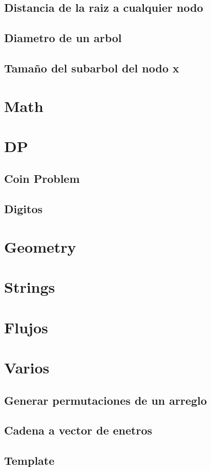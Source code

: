 	\subsection{Distancia de la raiz a cualquier nodo}
	\subsection{Diametro de un arbol}
	\subsection{Tamaño del subarbol del nodo x}


\section{Math}

\section{DP}
	\subsection{Coin Problem}
	\subsection{Digitos}

\section{Geometry}


\section{Strings}


\section{Flujos}


\section{Varios}
	\subsection{Generar permutaciones de un arreglo}
	\subsection{Cadena a vector de enetros}

	\subsection{Template}




